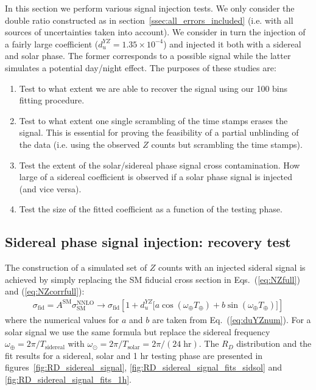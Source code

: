 In this section we perform various signal injection tests. We only consider the double ratio constructed as in section~\ref{ssec:all_errors_included} (i.e. with all sources of uncertainties taken into account). We consider in turn the injection of a fairly large coefficient ($d_u^{YZ} = 1.35 \times 10^{-4}$) and injected it both with a sidereal and solar phase. The former corresponds to a possible signal while the latter simulates a potential day/night effect. The purposes of these studies are:
\begin{enumerate}
    \item Test to what extent we are able to recover the signal using our 100 bins fitting procedure.
    \item Test to what extent one single scrambling of the time stamps erases the signal. This is essential for proving the feasibility of a partial unblinding of the data (i.e. using the observed $Z$ counts but scrambling the time stamps).
    \item Test the extent of the solar/sidereal phase signal cross contamination. How large of a sidereal coefficient is observed if a solar phase signal is injected (and vice versa). 
    \item Test the size of the fitted coefficient as a function of the testing phase. 
\end{enumerate}
%

\subsection{Sidereal phase signal injection: recovery test}
\label{ssec:SiderealInjectionRecovery}
%
The construction of a simulated set of $Z$ counts with an injected sideral signal is achieved by simply replacing the SM fiducial cross section in Eqs.~(\ref{eq:NZfull}) and (\ref{eq:NZcorrfull}):
%
\begin{align}
    \sigma_\text{fid} = A^\text{SM} \sigma_\text{SM}^\text{NNLO} 
    \longrightarrow
    \sigma_\text{fid} \left[ 1 + d_u^{YZ} \big[ a \cos (\omega_\oplus T_\oplus) + b \sin (\omega_\oplus T_\oplus) \big] \right]
\end{align}
%
where the numerical values for $a$ and $b$ are taken from Eq.~(\ref{eq:duYZnum}). For a solar signal we use the same formula but replace the sidereal frequency $\omega_\oplus = 2\pi/T_\text{sidereal}$ with $\omega_\odot = 2\pi/T_\text{solar} = 2\pi/(24\; \text{hr})$. The $R_D$ distribution and the fit results for a sidereal, solar and 1 hr testing phase are presented in figures~\ref{fig:RD_sidereal_signal}, \ref{fig:RD_sidereal_signal_fits_sidsol} and \ref{fig:RD_sidereal_signal_fits_1h}. 

